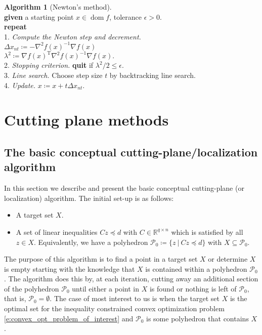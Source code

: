 \documentclass[11pt]{amsart}
\theoremstyle{definition}
\newtheorem{algorithm}{Algorithm}[section]
\theoremstyle{remark}
\newcommand{\ind}{\hspace*{0.5cm}}
\newcommand{\transpose}{\text{T}}
\DeclareMathOperator{\domain}{dom}
\begin{document}
        \begin{algorithm}[Newton's method]
        \label{a:basic_conceptual_cp_alg}\mbox{}\\
            \ind \textbf{given} a starting point $x \in \domain f$, tolerance $\epsilon > 0.$ \\
            \ind \textbf{repeat} \\
            \ind\ind 1. \emph{Compute the Newton step and decrement.} \\
            \ind\ind\ind $\Delta x_{nt} \coloneqq -\nabla^2 f(x)^{-1} \nabla f(x)$ \\
            \ind\ind\ind $\lambda^2 \coloneqq \nabla f(x)^\transpose \nabla^2 f(x)^{-1} \nabla f(x).$ \\
            \ind\ind 2. \emph{Stopping criterion.} \textbf{quit} if $\lambda^2/2 \leq \epsilon.$\\
            \ind\ind 3. \emph{Line search.} Choose step size $t$ by backtracking line search. \\
            \ind\ind 4. \emph{Update.} $x \coloneqq x + t\Delta x_{nt}.$ \\
        \end{algorithm} 

\section{Cutting plane methods}
    \subsection{The basic conceptual cutting-plane/localization algorithm}
        In this section we describe and present the basic conceptual cutting-plane (or localization) algorithm. The initial set-up is as follows:
        \begin{itemize}
            \item A target set $X$.
            \item A set of linear inequalities $Cz \preceq d$ with $C \in \mathbb{R}^{q \times n}$ which is satisfied by all $z \in X$. Equivalently, we have a polyhedron $\mathcal{P}_0 \coloneqq \{ z \:|\: Cz \preceq d\}$ with $X \subseteq \mathcal{P}_0$. 
        \end{itemize}
        The purpose of this algorithm is to find a point in a target set $X$ or determine $X$ is empty starting with the knowledge that $X$ is contained within a polyhedron $\mathcal{P}_0$. The algorithm does this by, at each iteration, cutting away an additional section of the polyhedron $\mathcal{P}_0$ until either a point in $X$ is found or nothing is left of $\mathcal{P}_0$, that is, $\mathcal{P}_0 = \emptyset$. The case of most interest to us is when the target set $X$ is the optimal set for the inequality constrained convex optimization problem \eqref{e:convex_opt_problem_of_interest} and $\mathcal{P}_0$ is some polyhedron that contains $X$.
\end{document}
